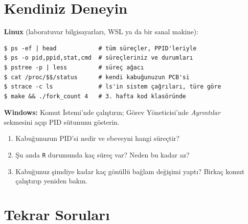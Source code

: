 \section{Kendiniz Deneyin}

\begin{tryit}
\textbf{Linux} (laboratuvar bilgisayarları, WSL ya da bir sanal makine):
\begin{lstlisting}[style=term]
$ ps -ef | head            # tüm süreçler, PPID'leriyle
$ ps -o pid,ppid,stat,cmd  # süreçleriniz ve durumları
$ pstree -p | less         # süreç ağacı
$ cat /proc/$$/status      # kendi kabuğunuzun PCB'si
$ strace -c ls             # ls'in sistem çağrıları, türe göre
$ make && ./fork_count 4   # 3. hafta kod klasöründe
\end{lstlisting}
\textbf{Windows:} Komut İstemi'nde  çalıştırın; Görev Yöneticisi'nde \emph{Ayrıntılar} sekmesini açıp PID sütununu gösterin.
\begin{enumerate}[leftmargin=1.4em]
  \item Kabuğunuzun PID'si nedir ve ebeveyni hangi süreçtir?
  \item Şu anda \texttt{R} durumunda kaç süreç var? Neden bu kadar az?
  \item Kabuğunuz şimdiye kadar kaç gönüllü bağlam değişimi yaptı? Birkaç komut çalıştırıp yeniden bakın.
\end{enumerate}
\end{tryit}

\section{Tekrar Soruları}

